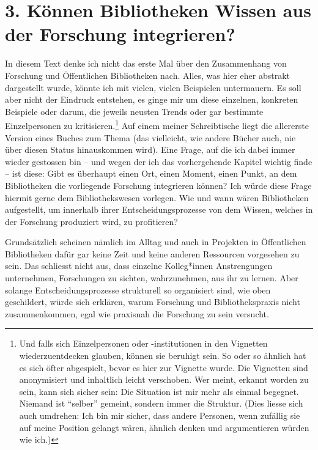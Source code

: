 \documentclass[a4paper,
fontsize=11pt,
oneside,
numbers=noperiodatend,
parskip=half-,
bibliography=totoc,
final
]{scrartcl}
\begin{document}
\hypertarget{kuxf6nnen-bibliotheken-wissen-aus-der-forschung-integrieren}{%
\section{3. Können Bibliotheken Wissen aus der Forschung
integrieren?}\label{kuxf6nnen-bibliotheken-wissen-aus-der-forschung-integrieren}}

In diesem Text denke ich nicht das erste Mal über den Zusammenhang von
Forschung und Öffentlichen Bibliotheken nach. Alles, was hier eher
abstrakt dargestellt wurde, könnte ich mit vielen, vielen Beispielen
untermauern. Es soll aber nicht der Eindruck entstehen, es ginge mir um
diese einzelnen, konkreten Beispiele oder darum, die jeweils neusten
Trends oder gar bestimmte Einzelpersonen zu kritisieren.\footnote{Und
  falls sich Einzelpersonen oder -institutionen in den Vignetten
  wiederzuentdecken glauben, können sie beruhigt sein. So oder so
  ähnlich hat es sich öfter abgespielt, bevor es hier zur Vignette
  wurde. Die Vignetten sind anonymisiert und inhaltlich leicht
  verschoben. Wer meint, erkannt worden zu sein, kann sich sicher sein:
  Die Situation ist mir mehr als einmal begegnet. Niemand ist
  \enquote{selber} gemeint, sondern immer die Struktur. (Dies liesse
  sich auch umdrehen: Ich bin mir sicher, dass andere Personen, wenn
  zufällig sie auf meine Position gelangt wären, ähnlich denken und
  argumentieren würden wie ich.)} Auf einem meiner Schreibtische liegt
die allererste Version eines Buches zum Thema (das vielleicht, wie
andere Bücher auch, nie über diesen Status hinauskommen wird). Eine
Frage, auf die ich dabei immer wieder gestossen bin -- und wegen der ich
das vorhergehende Kapitel wichtig finde -- ist diese: Gibt es überhaupt
einen Ort, einen Moment, einen Punkt, an dem Bibliotheken die
vorliegende Forschung integrieren können? Ich würde diese Frage hiermit
gerne dem Bibliothekswesen vorlegen. Wie und wann wären Bibliotheken
aufgestellt, um innerhalb ihrer Entscheidungsprozesse von dem Wissen,
welches in der Forschung produziert wird, zu profitieren?

Grundsätzlich scheinen nämlich im Alltag und auch in Projekten in
Öffentlichen Bibliotheken dafür gar keine Zeit und keine anderen
Ressourcen vorgesehen zu sein. Das schliesst nicht aus, dass einzelne
Kolleg*innen Anstrengungen unternehmen, Forschungen zu sichten,
wahrzunehmen, aus ihr zu lernen. Aber solange Entscheidungsprozesse
strukturell so organisiert sind, wie oben geschildert, würde sich
erklären, warum Forschung und Bibliothekspraxis nicht zusammenkommen,
egal wie praxisnah die Forschung zu sein versucht.
\end{document}
